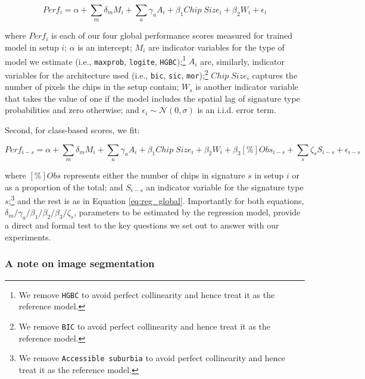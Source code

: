 \begin{equation}
        Perf_i = \alpha +
        \sum_m \delta_m M_i +
        \sum_a \gamma_a A_i +
        \beta_1 Chip \; Size_i +
        \beta_2 W_i +
        \epsilon_i
        \label{eq:reg_global}
\end{equation}


where $Perf_i$ is each of our four global performance scores measured for trained
model in setup $i$; $\alpha$ is an intercept; $M_i$ are indicator variables for the
type of model we estimate (i.e., \texttt{maxprob}, \texttt{logite},
\texttt{HGBC});\footnote{We remove \texttt{HGBC} to avoid perfect
collinearity and hence treat it as the reference model.} $A_i$ are,
similarly, indicator variables for the architecture used (i.e.,
\texttt{bic}, \texttt{sic}, \texttt{mor});\footnote{We remove \texttt{BIC} to avoid perfect
collinearity and hence treat it as the reference model.} $Chip \; Size_i$
captures the number of pixels the chips in the setup contain; $W_s$ is another
indicator variable that takes the value of one if the model includes the
spatial lag of signature type probabilities and zero otherwise;
and $\epsilon_i \sim \mathcal{N}(0, \sigma)$ is an i.i.d. error term.

Second, for class-based scores, we fit:

\begin{equation}
        Perf_{i-s} = \alpha +
        \sum_m \delta_m M_i +
        \sum_a \gamma_a A_i +
        \beta_1 Chip \; Size_i +
        \beta_2 W_i +
        \beta_3 \left[\%\right]Obs_{i-s} +
        \sum_s \zeta_s S_{i-s} +
        \epsilon_{i-s}
        \label{eq:reg_class}
\end{equation}

where $\left[\%\right]Obs$ represents either the number of chips in
signature $s$ in setup $i$ or as a proportion of the total; and $S_{i-s}$ an
indicator variable for the signature type $s$;\footnote{We remove
\texttt{Accessible suburbia} to avoid perfect collinearity and hence treat it
as the reference model.} and the rest is as in Equation \ref{eq:reg_global}.
%
Importantly for both equations,
$\delta_m/\gamma_a/\beta_1/\beta_2/\beta_3/\zeta_s$, parameters to be
estimated by the regression model, provide a direct and formal test to the key
questions we set out to answer with our experiments.

\subsubsection{A note on image segmentation}

